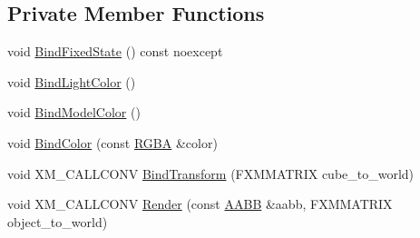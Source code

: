 \subsection*{Private Member Functions}
\begin{DoxyCompactItemize}
\item 
void \hyperlink{classmage_1_1rendering_1_1_bounding_volume_pass_a117de59e78f7219b10795678eeacff34}{Bind\+Fixed\+State} () const noexcept
\item 
void \hyperlink{classmage_1_1rendering_1_1_bounding_volume_pass_a0bf1d814b3ebb56a6076bfb1cb27de8d}{Bind\+Light\+Color} ()
\item 
void \hyperlink{classmage_1_1rendering_1_1_bounding_volume_pass_a5b889af6dc3c58aecdd619dee69feca0}{Bind\+Model\+Color} ()
\item 
void \hyperlink{classmage_1_1rendering_1_1_bounding_volume_pass_a52c5852cfc290c5d07059537a26b71ea}{Bind\+Color} (const \hyperlink{structmage_1_1_r_g_b_a}{R\+G\+BA} \&color)
\item 
void X\+M\+\_\+\+C\+A\+L\+L\+C\+O\+NV \hyperlink{classmage_1_1rendering_1_1_bounding_volume_pass_aa43435b88597d4d9a59047f4558c4bab}{Bind\+Transform} (F\+X\+M\+M\+A\+T\+R\+IX cube\+\_\+to\+\_\+world)
\item 
void X\+M\+\_\+\+C\+A\+L\+L\+C\+O\+NV \hyperlink{classmage_1_1rendering_1_1_bounding_volume_pass_aad91ae836c4c556ec7ec3f477c139e6e}{Render} (const \hyperlink{classmage_1_1_a_a_b_b}{A\+A\+BB} \&aabb, F\+X\+M\+M\+A\+T\+R\+IX object\+\_\+to\+\_\+world)
\end{DoxyCompactItemize}
